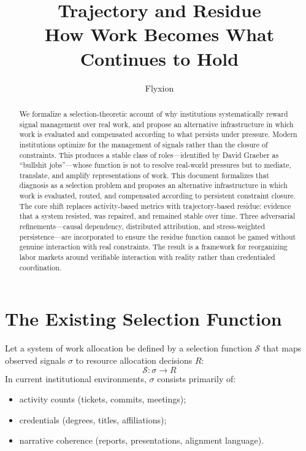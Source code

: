 \documentclass[12pt]{article}
\title{\textbf{Trajectory and Residue}\\[0.5em]
\large How Work Becomes What Continues to Hold}
\author{Flyxion}
\date{}
\begin{document}
\maketitle

\begin{abstract}
We formalize a selection-theoretic account of why institutions
systematically reward signal management over real work, and propose an
alternative infrastructure in which work is evaluated and compensated
according to what persists under pressure. Modern institutions optimize
for the management of signals rather than the closure of constraints.
This produces a stable class of
roles---identified by David Graeber as ``bullshit jobs''---whose
function is not to resolve real-world pressures but to mediate,
translate, and amplify representations of work. This document
formalizes that diagnosis as a selection problem and proposes an
alternative infrastructure in which work is evaluated, routed, and
compensated according to persistent constraint closure. The core shift
replaces activity-based metrics with trajectory-based residue: evidence
that a system resisted, was repaired, and remained stable over time.
Three adversarial refinements---causal dependency, distributed
attribution, and stress-weighted persistence---are incorporated to
ensure the residue function cannot be gamed without genuine interaction
with real constraints. The result is a framework for reorganizing labor
markets around verifiable interaction with reality rather than
credentialed coordination.
\end{abstract}

\section{The Existing Selection Function}

Let a system of work allocation be defined by a selection function
$\mathcal{S}$ that maps observed signals $\sigma$ to resource allocation
decisions $R$:
\[
  \mathcal{S} : \sigma \rightarrow R
\]
In current institutional environments, $\sigma$ consists primarily of:
\begin{itemize}
  \item activity counts (tickets, commits, meetings);
  \item credentials (degrees, titles, affiliations);
  \item narrative coherence (reports, presentations, alignment language).
\end{itemize}
\end{document}
